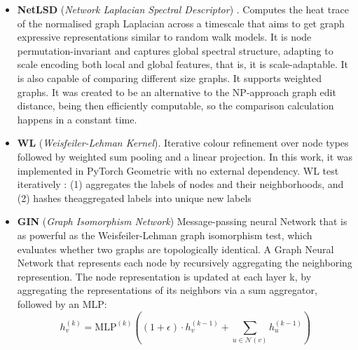 \documentclass[11pt, a4paper]{article}
\begin{document}
\begin{itemize}[leftmargin=*]

  \item \textbf{NetLSD} (\textit{Network Laplacian Spectral Descriptor}) \cite{netlsd}.
  Computes the heat trace of the normalised graph Laplacian across a timescale that aims to get graph expressive representations similar to random walk models.
  It is node permutation-invariant and captures global spectral structure, adapting to scale encoding both local and global features, that is, it is scale-adaptable. 
  It is also capable of comparing different size graphs. It supports weighted graphs. 
  It was created to be an alternative to the NP-approach graph edit distance, being then efficiently computable, so the comparison calculation happens in a constant time. 

  \item \textbf{WL} (\textit{Weisfeiler-Lehman Kernel}).
    Iterative colour refinement over node types followed by weighted sum pooling and a linear projection. 
    In this work, it was implemented in PyTorch Geometric with no external dependency. 
    WL test iteratively : 
    (1) aggregates the labels of nodes and their neighborhoods, 
    and (2) hashes theaggregated labels into unique new labels

  \item \textbf{GIN} (\textit{Graph Isomorphism Network}) \cite{xu2019gin}
   Message-passing neural Network that is as powerful as the Weisfeiler-Lehman graph isomorphism test, which evaluates whether two graphs are topologically identical.
    A Graph Neural Network that represents each node by recursively aggregating the neighboring represention. 
    The node representation is updated at each layer k, by aggregating the representations of its neighbors via a sum aggregator, followed by an MLP:
    $$h_v^{(k)} = \text{MLP}^{(k)}\!\left((1+\epsilon)\cdot h_v^{(k-1)} + \sum_{u \in \mathcal{N}(v)} h_u^{(k-1)}\right)$$


\end{itemize}
\end{document}
